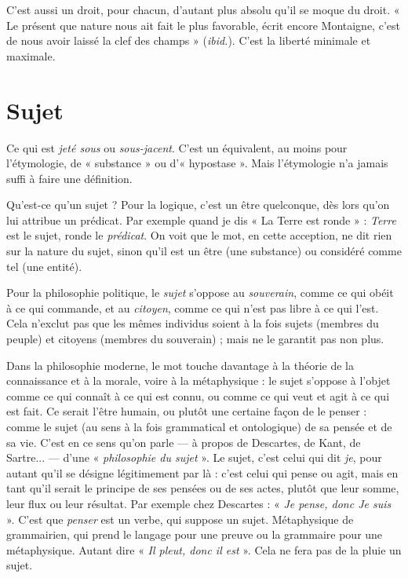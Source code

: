 C’est aussi un droit, pour chacun, d’autant plus absolu qu’il se moque du
droit. « Le présent que nature nous ait fait le plus favorable, écrit encore Montaigne,
c'est de nous avoir laissé la clef des champs » ({\it ibid.}). C’est la liberté
minimale et maximale.

\section{Sujet}
Ce qui est {\it jeté sous} ou {\it sous-jacent}. C’est un équivalent, au moins pour
l'étymologie, de « substance » ou d’« hypostase ». Mais l’étymologie
n'a jamais suffi à faire une définition.

Qu'est-ce qu’un sujet ? Pour la logique, c’est un être quelconque, dès lors
qu'on lui attribue un prédicat. Par exemple quand je dis « La Terre est ronde » :
{\it Terre} est le sujet, ronde le {\it prédicat}. On voit que le mot, en cette acception, ne
dit rien sur la nature du sujet, sinon qu’il est un être (une substance) ou considéré
comme tel (une entité).

Pour la philosophie politique, le {\it sujet} s'oppose au {\it souverain}, comme ce qui
obéit à ce qui commande, et au {\it citoyen}, comme ce qui n’est pas libre à ce qui
l'est. Cela n'exclut pas que les mêmes individus soient à la fois sujets (membres
du peuple) et citoyens (membres du souverain) ; mais ne le garantit pas non
plus.

Dans la philosophie moderne, le mot touche davantage à la théorie de la
connaissance et à la morale, voire à la métaphysique : le sujet s’oppose à l’objet
comme ce qui connaît à ce qui est connu, ou comme ce qui veut et agit à ce qui
est fait. Ce serait l’être humain, ou plutôt une certaine façon de le penser :
comme le sujet (au sens à la fois grammatical et ontologique) de sa pensée et de
sa vie. C’est en ce sens qu’on parle — à propos de Descartes, de Kant, de
Sartre... — d’une « {\it philosophie du sujet} ». Le sujet, c’est celui qui dit {\it je}, pour
autant qu'il se désigne légitimement par là : c’est celui qui pense ou agit, mais
en tant qu'il serait le principe de ses pensées ou de ses actes, plutôt que leur
somme, leur flux ou leur résultat. Par exemple chez Descartes : « {\it Je pense, donc
Je suis} ». C’est que {\it penser} est un verbe, qui suppose un sujet. Métaphysique de
grammairien, qui prend le langage pour une preuve ou la grammaire pour une
métaphysique. Autant dire « {\it Il pleut, donc il est} ». Cela ne fera pas de la pluie
un sujet.

